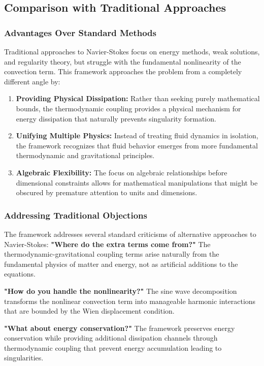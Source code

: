 ﻿\documentclass[12pt]{article}
\begin{document}
\subsection{Comparison with Traditional Approaches}
\subsubsection{Advantages Over Standard Methods}
Traditional approaches to Navier-Stokes focus on energy methods, weak solutions, and regularity theory, but struggle with the fundamental nonlinearity of the convection term. This framework approaches the problem from a completely different angle by:
\begin{enumerate}
   \item \textbf{Providing Physical Dissipation:} Rather than seeking purely mathematical bounds, the thermodynamic coupling provides a physical mechanism for energy dissipation that naturally prevents singularity formation.
   \item \textbf{Unifying Multiple Physics:} Instead of treating fluid dynamics in isolation, the framework recognizes that fluid behavior emerges from more fundamental thermodynamic and gravitational principles.
   \item \textbf{Algebraic Flexibility:} The focus on algebraic relationships before dimensional constraints allows for mathematical manipulations that might be obscured by premature attention to units and dimensions.
\end{enumerate}

\subsubsection{Addressing Traditional Objections}
The framework addresses several standard criticisms of alternative approaches to Navier-Stokes:
\textbf{"Where do the extra terms come from?"} The thermodynamic-gravitational coupling terms arise naturally from the fundamental physics of matter and energy, not as artificial additions to the equations.

\textbf{"How do you handle the nonlinearity?"} The sine wave decomposition transforms the nonlinear convection term into manageable harmonic interactions that are bounded by the Wien displacement condition.

\textbf{"What about energy conservation?"} The framework preserves energy conservation while providing additional dissipation channels through thermodynamic coupling that prevent energy accumulation leading to singularities.
\end{document}
